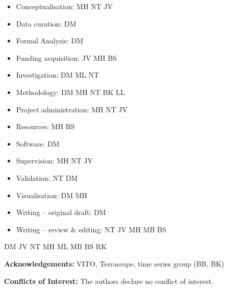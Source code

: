 \documentclass[a4paper,10pt]{article}
\newcommand{\minisection}[1]{\medskip \textbf{#1:}}
\begin{document}
\begin{itemize}
    \item Conceptualisation: MH NT JV
    \item Data curation: DM
    \item Formal Analysis: DM
    \item Funding acquisition: JV MH BS
    \item Investigation: DM ML NT
    \item Methodology: DM MH NT BK LL
    \item Project administration: MH NT JV
    \item Resources: MH BS
    \item Software: DM
    \item Supervision: MH NT JV
    \item Validation: NT DM
    \item Visualisation: DM MH
    \item Writing – original draft: DM
    \item Writing – review \& editing: NT JV MH MB BS
\end{itemize}

DM JV NT MH ML MB BS RK

\minisection{Acknowledgements} VITO, Terrascope, time series group (BB, BK)

\minisection{Conflicts of Interest} The authors declare no conflict of interest.


\printnoidxglossary[type=acronym]


\end{document}

